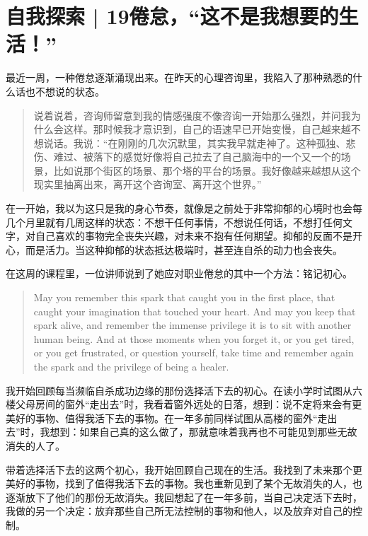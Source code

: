 \chapter{自我探索 | 19\pozhehao{}倦怠，“这不是我想要的生活！”}




最近一周，一种倦怠逐渐涌现出来。在昨天的心理咨询里，我陷入了那种熟悉的什么话也不想说的状态。

\blockquote{
    说着说着，咨询师留意到我的情感强度不像咨询一开始那么强烈，并问我为什么会这样。那时候我才意识到，自己的语速早已开始变慢，自己越来越不想说话。我说：“在刚刚的几次沉默里，其实我早就走神了。这种孤独、悲伤、难过、被落下的感觉好像将自己拉去了自己脑海中的一个又一个的场景，比如说那个街区的场景、那个塔的平台的场景。我好像越来越想从这个现实里抽离出来，离开这个咨询室、离开这个世界。”

}

在一开始，我以为这只是我的身心节奏，就像是之前处于非常抑郁的心境时也会每几个月里就有几周这样的状态：不想干任何事情，不想说任何话，不想打任何文字，对自己喜欢的事物完全丧失兴趣，对未来不抱有任何期望。抑郁的反面不是开心，而是活力。当这种抑郁的状态抵达极端时，甚至连自杀的动力也会丧失。

在这周的课程里，一位讲师说到了她应对职业倦怠的其中一个方法：铭记初心。

\blockquote{May you remember this spark that caught you in the first place, that caught your imagination that touched your heart. And may you keep that spark alive, and remember the immense privilege it is to sit with another human being. And at those moments when you forget it, or you get tired, or you get frustrated, or question yourself, take time and remember again the spark and the privilege of being a healer.}

我开始回顾每当濒临自杀成功边缘的那份选择活下去的初心。在读小学时试图从六楼父母房间的窗外“走出去”时，我看着窗外远处的日落，想到：说不定将来会有更美好的事物、值得我活下去的事物。在一年多前同样试图从高楼的窗外“走出去”时，我想到：如果自己真的这么做了，那就意味着我再也不可能见到那些无故消失的人了。

带着选择活下去的这两个初心，我开始回顾自己现在的生活。我找到了未来那个更美好的事物，找到了值得我活下去的事物。我也重新见到了某个无故消失的人，也逐渐放下了他们的那份无故消失。我回想起了在一年多前，当自己决定活下去时，我做的另一个决定：放弃那些自己所无法控制的事物和他人，以及放弃对自己的控制。

